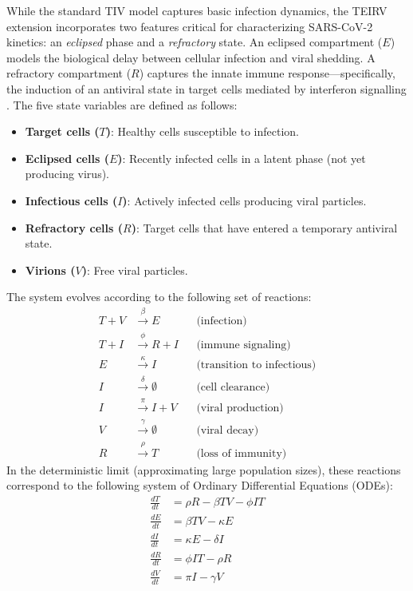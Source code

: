 \documentclass{article}
\begin{document}
While the standard TIV model captures basic infection dynamics, the TEIRV extension incorporates two features critical for characterizing SARS-CoV-2 kinetics: an \textit{eclipsed} phase and a \textit{refractory} state. An eclipsed compartment ($E$) models the biological delay between cellular infection and viral shedding. A refractory compartment ($R$) captures the innate immune response—specifically, the induction of an antiviral state in target cells mediated by interferon signalling \cite{Ke2022SarsData, BlancoMelo2020}. The five state variables are defined as follows:
\begin{itemize}
    \item \textbf{Target cells ($T$)}: Healthy cells susceptible to infection.
    \item \textbf{Eclipsed cells ($E$)}: Recently infected cells in a latent phase (not yet producing virus).
    \item \textbf{Infectious cells ($I$)}: Actively infected cells producing viral particles.
    \item \textbf{Refractory cells ($R$)}: Target cells that have entered a temporary antiviral state.
    \item \textbf{Virions ($V$)}: Free viral particles.
\end{itemize}
The system evolves according to the following set of reactions:
\begin{align}
    T + V &\xrightarrow{\beta} E && \text{(infection)} \\
    T + I &\xrightarrow{\phi} R + I && \text{(immune signaling)} \label{rxn:signaling}\\
    E &\xrightarrow{\kappa} I && \text{(transition to infectious)} \\
    I &\xrightarrow{\delta} \emptyset && \text{(cell clearance)} \\
    I &\xrightarrow{\pi} I + V && \text{(viral production)} \\
    V &\xrightarrow{\gamma} \emptyset && \text{(viral decay)} \\
    R &\xrightarrow{\rho} T && \text{(loss of immunity)}
\end{align}
In the deterministic limit (approximating large population sizes), these reactions correspond to the following system of Ordinary Differential Equations (ODEs):
\begin{align} 
    \frac{dT}{dt} &= \rho R - \beta T V - \phi I T \label{eq:dT} \\ 
    \frac{dE}{dt} &= \beta T V - \kappa E \\
    \frac{dI}{dt} &= \kappa E - \delta I \\
    \frac{dR}{dt} &= \phi I T - \rho R \\ 
    \frac{dV}{dt} &= \pi I - \gamma V 
\end{align}
\end{document}
